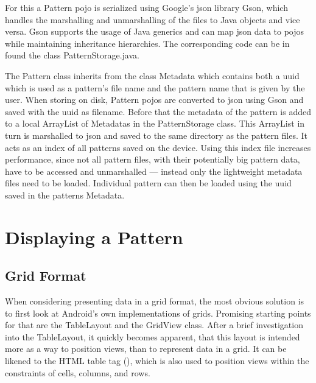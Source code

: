 For this a Pattern \gls{pojo} is serialized using Google’s \gls{json} library Gson, which handles the marshalling and unmarshalling of the files to Java objects and vice versa. Gson supports the usage of Java generics and can map \gls{json} data to \gls{pojo}s while maintaining inheritance hierarchies. The corresponding code can be in found the class PatternStorage.java.

The Pattern class inherits from the class Metadata which contains both a \gls{uuid} which is used as a pattern's file name and the pattern name that is given by the user. When storing on disk, Pattern \gls{pojo}s are converted to \gls{json} using Gson and saved with the \gls{uuid} as filename. Before that the metadata of the pattern is added to a local ArrayList of Metadatas in the PatternStorage class.  This ArrayList in turn is marshalled to \gls{json} and saved to the same directory as the pattern files. It acts as an index of all patterns saved on the device. Using this index file increases performance, since not all pattern files, with their potentially big pattern data, have to be accessed and unmarshalled --- instead only the lightweight metadata files need to be loaded. Individual pattern can then be loaded using the \gls{uuid} saved in the patterns Metadata.

\section{Displaying a Pattern}

\subsection{Grid Format}
\label{impl_grid_format}
When considering presenting data in a grid format, the most obvious solution is to first look at Android's own implementations of grids. Promising 
starting points for that are the TableLayout and the GridView class. After a brief investigation into the TableLayout, it quickly becomes apparent, that this layout is intended more as a way to position views, than to represent data in a grid. It can be likened to the HTML table tag (\cite{android_tablelayout}), which is also used to position views within the constraints of cells, columns, and rows.

